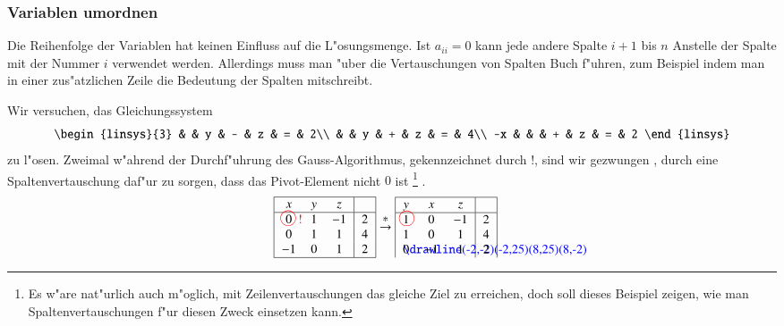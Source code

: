 \subsubsection{Variablen umordnen}
Die Reihenfolge der Variablen hat keinen Einfluss auf die L"osungsmenge.
Ist $a_{ii}=0$ kann jede andere Spalte $i+1$ bis $n$ Anstelle der
Spalte mit der Nummer $i$ verwendet werden. Allerdings muss man "uber
die Vertauschungen von Spalten Buch f"uhren, zum Beispiel indem man in
einer zus"atzlichen Zeile die Bedeutung der Spalten mitschreibt.

\begin{beispiel}[\bf Beispiel]
Wir versuchen, das Gleichungssystem
$$
\begin{linsys}{3}
   &   & y & - & z & = & 2\\
   &   & y & + & z & = & 4\\
-x &   &   & + & z & = & 2
\end{linsys}
$$
zu l"osen. Zweimal w"ahrend der Durchf"uhrung des Gauss-Algorithmus,
gekennzeichnet durch {\color{red}!},
sind wir gezwungen%
, durch eine Spaltenvertauschung daf"ur zu
sorgen, dass das Pivot-Element nicht $0$ ist%
\footnote{Es w"are nat"urlich auch m"oglich,
mit Zeilenvertauschungen das gleiche Ziel zu erreichen, doch soll
dieses Beispiel zeigen, wie man Spaltenvertauschungen f"ur diesen
Zweck einsetzen kann.}%
.
\begin{align*}
\begin{tabular}{|>{$}c<{$}>{$}c<{$}>{$}c<{$}|>{$}c<{$}|}
\hline
x&y&z&\\
\hline
0%
\begin{picture}(0,0)
\color{red}\put(-3,4){\circle{12}}
\put(5,0){!}
\end{picture}%
&1&-1&2\\
0&1&1&4\\
-1&0&1&2\\
\hline
\end{tabular}
&\overset{\displaystyle *}{\rightarrow}
\begin{tabular}{|>{$}c<{$}>{$}c<{$}>{$}c<{$}|>{$}c<{$}|}
\hline
y&x&z&\\
\hline
\begin{picture}(0,0)
\color{red}\put(3,4){\circle{12}}
\end{picture}%
1&0&-1&2\\
1&0&1&4\\
\begin{picture}(0,0)
\color{blue}\drawline(-2,-2)(-2,25)(8,25)(8,-2)
\end{picture}%
0&-1&1&2\\

\end{tabular}
\end{align*}
\end{beispiel}
